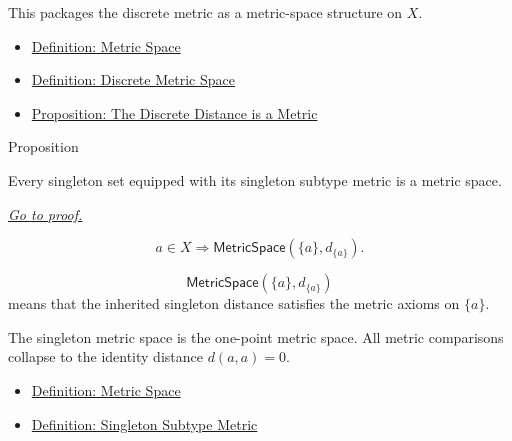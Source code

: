 \begin{remark*}[Interpretation]
This packages the discrete metric as a metric-space structure on \(X\).
\end{remark*}

\begin{dependencies}
\begin{itemize}
  \item \hyperref[def:metric-space]{Definition: Metric Space}
  \item \hyperref[def:discrete-metric-space]{Definition: Discrete Metric Space}
  \item \hyperref[prop:discrete-metric-space]{Proposition: The Discrete Distance is a Metric}
\end{itemize}
\end{dependencies}

\begin{propositionbox}{Proposition}
\begin{proposition}
\label{prop:singleton-set-metric-space}
Every singleton set equipped with its singleton subtype metric is a metric
space.

\smallskip
\noindent
\hyperref[prf:singleton-set-metric-space]{\textit{Go to proof.}}
\end{proposition}
\end{propositionbox}

\begin{remark*}
\[
a\in X
\Longrightarrow
\mathsf{MetricSpace}(\{a\},d_{\{a\}}).
\]
\end{remark*}

\begin{remark*}
\[
\mathsf{MetricSpace}(\{a\},d_{\{a\}})
\]
means that the inherited singleton distance satisfies the metric axioms on
\(\{a\}\).
\end{remark*}

\begin{remark*}[Interpretation]
The singleton metric space is the one-point metric space.  All metric
comparisons collapse to the identity distance \(d(a,a)=0\).
\end{remark*}


\begin{dependencies}
\begin{itemize}
  \item \hyperref[def:metric-space]{Definition: Metric Space}
  \item \hyperref[def:singleton-subtype-metric]{Definition: Singleton Subtype Metric}
\end{itemize}
\end{dependencies}

